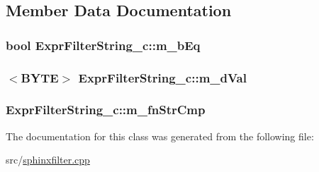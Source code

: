 \subsection{Member Data Documentation}
\hypertarget{classExprFilterString__c_ac8b233acb6be735f8c9e0ca25e519ee3}{
\subsubsection[{m\-\_\-b\-Eq}]{\setlength{\rightskip}{0pt plus 5cm}bool Expr\-Filter\-String\-\_\-c\-::m\-\_\-b\-Eq\hspace{0.3cm}{\ttfamily [protected]}}}\label{classExprFilterString__c_ac8b233acb6be735f8c9e0ca25e519ee3}
\hypertarget{classExprFilterString__c_a99e8f854a5fb150360e457d5a6a72c81}{
\subsubsection[{m\-\_\-d\-Val}]{$<${\bf B\-Y\-T\-E}$>$ Expr\-Filter\-String\-\_\-c\-::m\-\_\-d\-Val\hspace{0.3cm}{\ttfamily [protected]}}}\label{classExprFilterString__c_a99e8f854a5fb150360e457d5a6a72c81}
\hypertarget{classExprFilterString__c_abcf6a320df6a1c9a687797f17259f40d}{
\subsubsection[{m\-\_\-fn\-Str\-Cmp}]{ Expr\-Filter\-String\-\_\-c\-::m\-\_\-fn\-Str\-Cmp\hspace{0.3cm}{\ttfamily [protected]}}}\label{classExprFilterString__c_abcf6a320df6a1c9a687797f17259f40d}


The documentation for this class was generated from the following file\-:\begin{DoxyCompactItemize}
\item 
src/\hyperlink{sphinxfilter_8cpp}{sphinxfilter.\-cpp}\end{DoxyCompactItemize}
